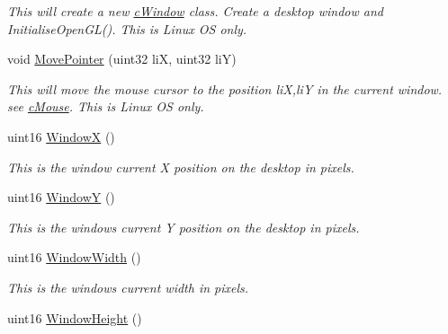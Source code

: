 \begin{DoxyCompactItemize}
\begin{DoxyCompactList}\small\item\em This will create a new \hyperlink{classc_window}{cWindow} class. Create a desktop window and InitialiseOpenGL(). This is Linux OS only. \end{DoxyCompactList}\item 
\hypertarget{classc_window_afa140a737ae105dc72a7e2e99af4b8f7}{
void \hyperlink{classc_window_afa140a737ae105dc72a7e2e99af4b8f7}{MovePointer} (uint32 liX, uint32 liY)}
\label{classc_window_afa140a737ae105dc72a7e2e99af4b8f7}

\begin{DoxyCompactList}\small\item\em This will move the mouse cursor to the position liX,liY in the current window. see \hyperlink{classc_mouse}{cMouse}. This is Linux OS only. \end{DoxyCompactList}\item 
\hypertarget{classc_window_ae9c7bdf89f7ae2d17cfb2456454603fa}{
uint16 \hyperlink{classc_window_ae9c7bdf89f7ae2d17cfb2456454603fa}{WindowX} ()}
\label{classc_window_ae9c7bdf89f7ae2d17cfb2456454603fa}

\begin{DoxyCompactList}\small\item\em This is the window current X position on the desktop in pixels. \end{DoxyCompactList}\item 
\hypertarget{classc_window_a7b6b17752cda78dce129503a5ba0102c}{
uint16 \hyperlink{classc_window_a7b6b17752cda78dce129503a5ba0102c}{WindowY} ()}
\label{classc_window_a7b6b17752cda78dce129503a5ba0102c}

\begin{DoxyCompactList}\small\item\em This is the windows current Y position on the desktop in pixels. \end{DoxyCompactList}\item 
\hypertarget{classc_window_ab04ab97debe67eec482274f32d9a98ee}{
uint16 \hyperlink{classc_window_ab04ab97debe67eec482274f32d9a98ee}{WindowWidth} ()}
\label{classc_window_ab04ab97debe67eec482274f32d9a98ee}

\begin{DoxyCompactList}\small\item\em This is the windows current width in pixels. \end{DoxyCompactList}\item 
\hypertarget{classc_window_a0465714995dafedf04b72845ec5c97ce}{
uint16 \hyperlink{classc_window_a0465714995dafedf04b72845ec5c97ce}{WindowHeight} ()}
\label{classc_window_a0465714995dafedf04b72845ec5c97ce}


\end{DoxyCompactItemize}
